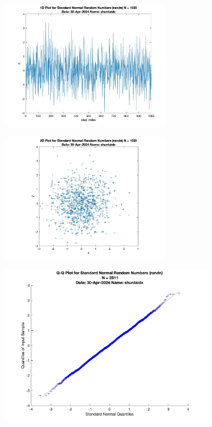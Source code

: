 \begin{figure}
\begin{subfigure}{0.48\linewidth}
    \end{subfigure}
    \begin{subfigure}{0.48\linewidth}
        \centering
        \includegraphics[width=0.8\textwidth]{src/figures/standard-normal/randn_1Dpl_N=1000.jpg}
        \label{fig:standard-normal-1Dpl}
    \end{subfigure}
    \begin{subfigure}{0.48\linewidth}
        \centering
        \includegraphics[width=0.8\textwidth]{src/figures/standard-normal/randn_2Dpl_N=1000.jpg}
        \label{fig:standard-normal-2Dpl}
    \end{subfigure}
    \begin{subfigure}{0.48\linewidth}
        \centering
        \includegraphics[width=0.8\linewidth]{src/figures/standard-normal/randn_qqpl_N=2511.jpg}

\end{subfigure}
\end{figure}
